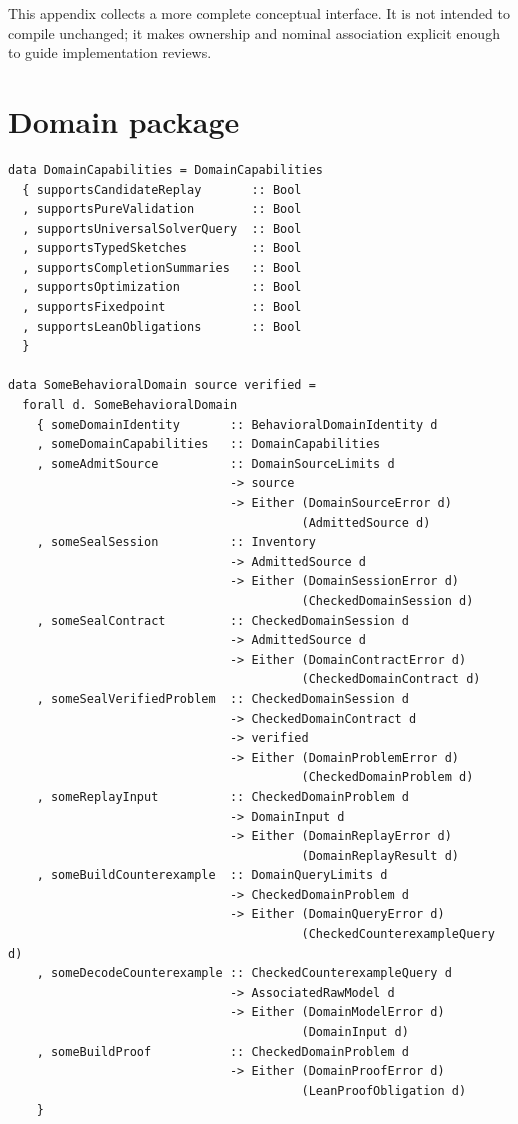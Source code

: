 \documentclass[11pt,oneside]{report}
\begin{document}
This appendix collects a more complete conceptual interface. It is not intended to compile unchanged; it makes ownership and nominal association explicit enough to guide implementation reviews.

\section{Domain package}

\begin{lstlisting}[language=HaskellX,caption={Extended domain package.},label={lst:extended-domain}]
data DomainCapabilities = DomainCapabilities
  { supportsCandidateReplay       :: Bool
  , supportsPureValidation        :: Bool
  , supportsUniversalSolverQuery  :: Bool
  , supportsTypedSketches         :: Bool
  , supportsCompletionSummaries   :: Bool
  , supportsOptimization          :: Bool
  , supportsFixedpoint            :: Bool
  , supportsLeanObligations       :: Bool
  }

data SomeBehavioralDomain source verified =
  forall d. SomeBehavioralDomain
    { someDomainIdentity       :: BehavioralDomainIdentity d
    , someDomainCapabilities   :: DomainCapabilities
    , someAdmitSource          :: DomainSourceLimits d
                               -> source
                               -> Either (DomainSourceError d)
                                         (AdmittedSource d)
    , someSealSession          :: Inventory
                               -> AdmittedSource d
                               -> Either (DomainSessionError d)
                                         (CheckedDomainSession d)
    , someSealContract         :: CheckedDomainSession d
                               -> AdmittedSource d
                               -> Either (DomainContractError d)
                                         (CheckedDomainContract d)
    , someSealVerifiedProblem  :: CheckedDomainSession d
                               -> CheckedDomainContract d
                               -> verified
                               -> Either (DomainProblemError d)
                                         (CheckedDomainProblem d)
    , someReplayInput          :: CheckedDomainProblem d
                               -> DomainInput d
                               -> Either (DomainReplayError d)
                                         (DomainReplayResult d)
    , someBuildCounterexample  :: DomainQueryLimits d
                               -> CheckedDomainProblem d
                               -> Either (DomainQueryError d)
                                         (CheckedCounterexampleQuery d)
    , someDecodeCounterexample :: CheckedCounterexampleQuery d
                               -> AssociatedRawModel d
                               -> Either (DomainModelError d)
                                         (DomainInput d)
    , someBuildProof           :: CheckedDomainProblem d
                               -> Either (DomainProofError d)
                                         (LeanProofObligation d)
    }
\end{lstlisting}
\end{document}
